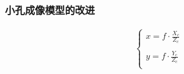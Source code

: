 \documentclass[aspectratio=43]{beamer}
\begin{document}
\begin{frame}
	\frametitle{小孔成像模型的改进}
	\begin{figure}
		\setcounter{subfigure}{0}
		\begin{center}
		\end{center}
	\end{figure}
	\begin{gather}
		\left\{ \begin{array}{c}
			x=f\cdot \frac{X_c}{Z_c}\\
			\\
			y=f\cdot \frac{Y_c}{Z_c}\\
		\end{array} \right. 	
	\end{gather}
\end{frame}
\end{document}
